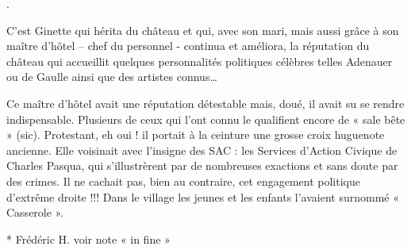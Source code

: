 \medskip

.

C’est Ginette qui hérita du château et qui, avec son mari, mais aussi grâce à son maître d’hôtel
– chef du personnel - continua et améliora, la réputation du château qui accueillit quelques
personnalités politiques célèbres telles Adenauer ou de Gaulle ainsi que des artistes connus…

\medskip

Ce maître d’hôtel avait une réputation détestable mais, doué, il avait su se rendre
indispensable. Plusieurs de ceux qui l’ont connu le qualifient encore de « sale bête » (sic).
Protestant, eh oui ! il portait à la ceinture une grosse croix huguenote ancienne. Elle voisinait
avec l’insigne des SAC : les Services d’Action Civique de Charles Pasqua, qui s’illustrèrent
par de nombreuses exactions et sans doute par des crimes. Il ne cachait pas, bien au contraire,
cet engagement politique d’extrême droite !!! Dans le village les jeunes et les enfants
l’avaient surnommé « Casserole ».

\medskip

* Frédéric H. voir note « in fine »
